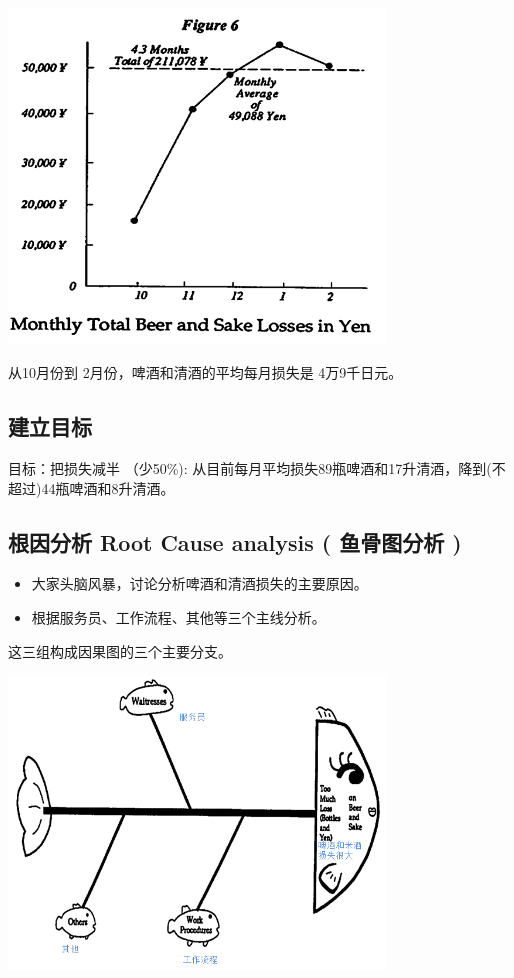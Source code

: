 \includegraphics[width=10cm]{club9.png}

从10月份到 2月份，啤酒和清酒的平均每月损失是 4万9千日元。

\hypertarget{ux5efaux7acbux76eeux6807}{%
\subsection{建立目标}\label{ux5efaux7acbux76eeux6807}}

目标：把损失减半 （少50\%):
从目前每月平均损失89瓶啤酒和17升清酒，降到(不超过)44瓶啤酒和8升清酒。

\hypertarget{ux6839ux56e0ux5206ux6790-root-cause-analysis-ux9c7cux9aa8ux56feux5206ux6790}{%
\subsection{根因分析 Root Cause analysis ( 鱼骨图分析
)}\label{ux6839ux56e0ux5206ux6790-root-cause-analysis-ux9c7cux9aa8ux56feux5206ux6790}}

\begin{itemize}
\tightlist
\item
  大家头脑风暴，讨论分析啤酒和清酒损失的主要原因。
\item
  根据服务员、工作流程、其他等三个主线分析。
\end{itemize}

这三组构成因果图的三个主要分支。


\includegraphics[width=10cm]{club111.png}

